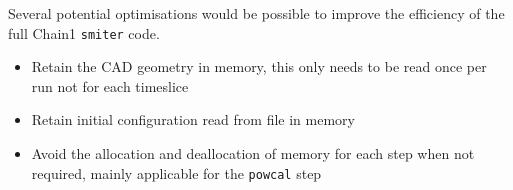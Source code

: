 Several potential optimisations would be possible to improve the efficiency of the full Chain1 {\tt smiter} code.

\begin{itemize}
\item Retain the CAD geometry in memory, this only needs to be read once per run not for each timeslice
\item Retain initial configuration read from file in memory
\item Avoid the allocation and deallocation of memory for each step when not required, mainly applicable for the {\tt powcal} step
\end{itemize}

